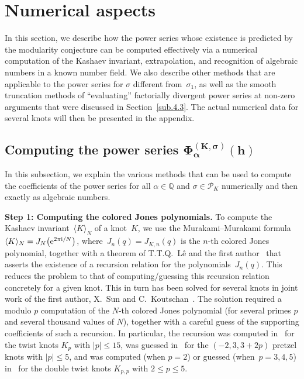 \documentclass[pdftex]{sigma}
\numberwithin{equation}{section}
\def\calP{\mathcal P}
\def\calP{\mathcal P}
\def\la{\langle}
\def\ra{\rangle}
\def\a{\alpha}
\def\Q{\mathbb Q}
\def\a{\alpha}
\def\s{\sigma}
\begin{document}

\section{Numerical aspects}
\label{sec.compKash}

In this section, we describe how the power series whose existence is predicted
by the modularity conjecture can be computed effectively via a
numerical computation of the Kashaev invariant, extrapolation, and
recognition of algebraic numbers in a known number field. We also
describe other methods that are applicable to the power series \smash{$\Phi_\a^{(K,\s)}(h)$}
for $\s$ different from~$\s_1$, as well as the smooth truncation
methods of ``evaluating'' factorially divergent power series at non-zero arguments
that were discussed in Section~\ref{sub.4.3}.
The actual numerical data for several knots will then be presented in the appendix.

\subsection[Computing the power series Phi\_a\^{}\{(K,s)\}(h)]{Computing the power series $\boldsymbol{\Phi_\a^{(K,\s)}(h)}$}
\label{sub.comp2}
In this subsection, we explain the various methods that can be used to compute the
coefficients of the power series \smash{$\Phi_\a^{(K,\s)}(h)$} for all $\a\in\Q$ and
$\s\in\calP_K$ numerically and then exactly as algebraic numbers.

{\bf Step 1: Computing the colored Jones polynomials.}
To compute the Kashaev invariant~$\la K \ra_N$ of a knot~$K$, we use
the Murakami--Murakami formula $\la K \ra_N=J_N\big({\rm e}^{2 \pi {\rm i}/N}\big)$, where~${J_n(q)\!=\!J_{K,n}(q)}$
is the $n$-th colored Jones polynomial, together with a theorem of T.T.Q.~L\^e and the
first author~\cite{GL} that asserts the existence of a recursion relation for
the polynomials~$J_n(q)$. This reduces the problem to that of
computing/guessing this recursion relation concretely for a given knot.
This in turn has been solved for several knots in joint work of the first author,
X.~Sun and C.~Koutschan~\cite{GK,GK2,GS}. The solution required a modulo $p$
computation of the $N$-th colored Jones polynomial (for several primes $p$
and several thousand values of $N$), together with a careful guess of the
supporting coefficients of such a recursion. In particular, the recursion
was computed in~\cite{GS} for the twist knots $K_p$ with $|p|\le15$, was
guessed in~\cite{GK} for the $(-2,3,3+2p)$ pretzel knots with $|p|\le5$,
and was computed (when $p=2$) or guessed (when~${p=3,4,5}$) in~\cite{GK2}
for the double twist knots $K_{p,p}$ with $2\le p\le5$.
\end{document}
